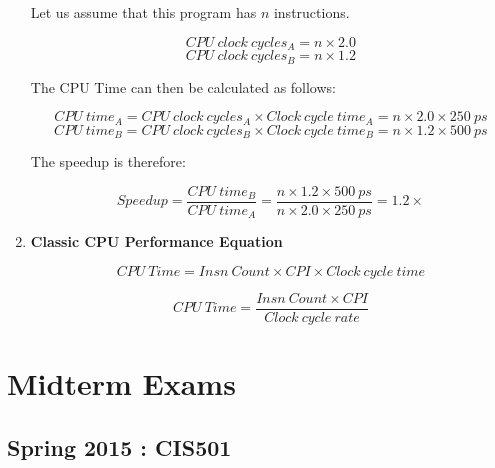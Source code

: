 \documentclass[12pt]{article}
\begin{document}
\begin{enumerate}
    Let us assume that this program has $n$ instructions.
    
    \begin{equation*}
        CPU\ clock\ cycles_{A} = n \times 2.0
    \end{equation*}
    \begin{equation*}
        CPU\ clock\ cycles_{B} = n \times 1.2
    \end{equation*}
    
    The CPU Time can then be calculated as follows:
    
    \begin{equation*}
        CPU\ time_{A} = CPU\ clock\ cycles_{A} \times Clock\ cycle\ time_{A} = n \times 2.0 \times 250\ ps
    \end{equation*}
    \begin{equation*}
        CPU\ time_{B} = CPU\ clock\ cycles_{B} \times Clock\ cycle\ time_{B} = n \times 1.2 \times 500\ ps
    \end{equation*}    
    
    The speedup is therefore:
    
    \begin{equation*}
        Speedup = \frac{CPU\ time_{B}}{CPU\ time_{A}} = \frac{n \times 1.2 \times 500\ ps}{n \times 2.0 \times 250\ ps} = 1.2 \times 
    \end{equation*}
    
    \item \textbf{Classic CPU Performance Equation}
    
    \begin{equation}
        CPU\ Time = Insn\ Count \times CPI \times Clock\ cycle\ time
    \end{equation}
    
    \begin{equation}
        CPU\ Time = \frac{Insn\ Count \times CPI}{Clock\ cycle\ rate}
    \end{equation}
    
\end{enumerate}

\clearpage

\section{Midterm Exams}

\subsection{Spring 2015 : CIS501}
\end{document}
